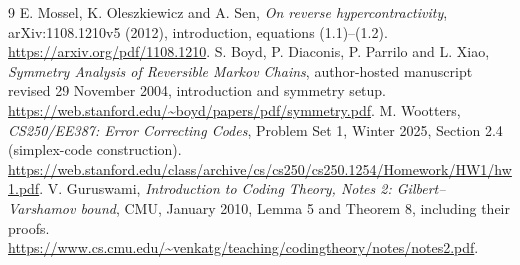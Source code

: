 \documentclass[11pt]{article}
\begin{document}
\begin{thebibliography}{9}
 E. Mossel, K. Oleszkiewicz and A. Sen, \emph{On reverse hypercontractivity}, arXiv:1108.1210v5 (2012), introduction, equations (1.1)--(1.2). \url{https://arxiv.org/pdf/1108.1210}.
 S. Boyd, P. Diaconis, P. Parrilo and L. Xiao, \emph{Symmetry Analysis of Reversible Markov Chains}, author-hosted manuscript revised 29 November 2004, introduction and symmetry setup. \url{https://web.stanford.edu/~boyd/papers/pdf/symmetry.pdf}.
 M. Wootters, \emph{CS250/EE387: Error Correcting Codes}, Problem Set 1, Winter 2025, Section 2.4 (simplex-code construction). \url{https://web.stanford.edu/class/archive/cs/cs250/cs250.1254/Homework/HW1/hw1.pdf}.
 V. Guruswami, \emph{Introduction to Coding Theory, Notes 2: Gilbert--Varshamov bound}, CMU, January 2010, Lemma 5 and Theorem 8, including their proofs. \url{https://www.cs.cmu.edu/~venkatg/teaching/codingtheory/notes/notes2.pdf}.
\end{thebibliography}
\end{document}
